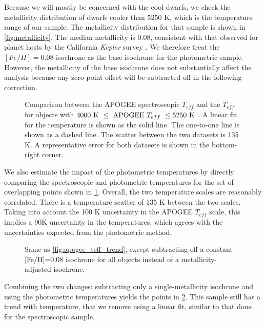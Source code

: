 \documentclass[manuscript]{aastex6}
\newcommand{\Kepler}{\mbox{\textit{Kepler}}}
\newcommand{\Teff}{\ensuremath{T_{eff}}}
\begin{document}
Because we will mostly be concerned with the cool dwarfs, we check the
metallicity distribution of dwarfs cooler than 5250 K, which is the 
temperature range of our sample. The metallicity distribution for that
sample is shown in \cref{fig:metallicity}. The median metallicity is 
0.08, consistent with that observed for planet hosts by 
the California \Kepler{} survey \citep{Petigura17}.  We therefore treat the \([Fe/H] =
0.08\) isochrone as the base isochrone for the photometric sample. However, the
metallicity of the base isochrone does not substantially affect the analysis
because any zero-point offset will be subtracted off in the following
correction.

\begin{figure}[htb]
    \centering
    \caption{Comparison between the APOGEE spectroscopic \Teff{} and the
        \citet{Pinsonneault12} \Teff{} for objects with \(4000 \textrm{ K } \le
    \textrm{ APOGEE \Teff{} } \le 5250 \textrm{ K }\). A linear fit for the
    temperature is shown as the solid line. The one-to-one line is shown
    as a dashed line. The scatter between the two datasets is 135 K. A 
    representative error for both datasets is shown in the bottom-right 
corner.}\label{fig:teffdiff}
\end{figure}

We also estimate the impact of the photometric temperatures by directly 
comparing the spectroscopic and photometric temperatures for the set of 
overlapping points shown in \cref{fig:teffdiff}. Overall, the two temperature scales are reasonably
correlated. There is a temperature scatter of 135 K between the two scales.
Taking into account the 100 K uncertainty in the APOGEE \Teff{} scale, this
implies a 90K uncertainty in the \citet{Pinsonneault12} temperatures, which
agrees with the uncertainties expected from the photometric method. 

\begin{figure}[htb]
    \centering
    \caption{Same as \cref{fig:apogee_teff_trend}, except subtracting off a
    constant [Fe/H]=0.08 isochrone for all objects instead of a 
    metallicity-adjusted isochrone.}\label{fig:photuncor}
\end{figure}

Combining the two changes: subtracting only a single-metallicity isochrone and
using the photometric temperatures yields the points in \cref{fig:photuncor}.
This sample still has a trend with temperature, that we remove using a linear
fit, similar to that done for the spectroscopic sample.
\end{document}
